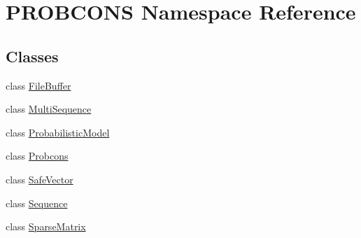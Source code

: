 \hypertarget{namespace_p_r_o_b_c_o_n_s}{\section{P\+R\+O\+B\+C\+O\+N\+S Namespace Reference}
\label{namespace_p_r_o_b_c_o_n_s}
}
\subsection*{Classes}
\begin{DoxyCompactItemize}
\item 
class \hyperlink{class_p_r_o_b_c_o_n_s_1_1_file_buffer}{File\+Buffer}
\item 
class \hyperlink{class_p_r_o_b_c_o_n_s_1_1_multi_sequence}{Multi\+Sequence}
\item 
class \hyperlink{class_p_r_o_b_c_o_n_s_1_1_probabilistic_model}{Probabilistic\+Model}
\item 
class \hyperlink{class_p_r_o_b_c_o_n_s_1_1_probcons}{Probcons}
\item 
class \hyperlink{class_p_r_o_b_c_o_n_s_1_1_safe_vector}{Safe\+Vector}
\item 
class \hyperlink{class_p_r_o_b_c_o_n_s_1_1_sequence}{Sequence}
\item 
class \hyperlink{class_p_r_o_b_c_o_n_s_1_1_sparse_matrix}{Sparse\+Matrix}
\end{DoxyCompactItemize}

